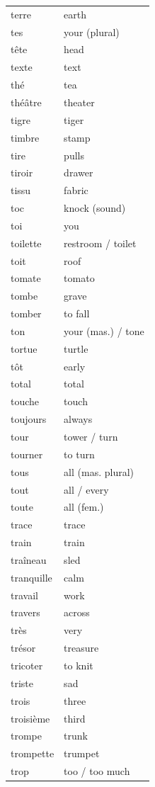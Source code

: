 \documentclass[12pt,a4paper]{article}
\begin{document}
\begin{longtable}{p{4cm} p{6cm}}
terre & earth \\
tes & your (plural) \\
tête & head \\
texte & text \\
thé & tea \\
théâtre & theater \\
tigre & tiger \\
timbre & stamp \\
tire & pulls \\
tiroir & drawer \\
tissu & fabric \\
toc & knock (sound) \\
toi & you \\
toilette & restroom / toilet \\
toit & roof \\
tomate & tomato \\
tombe & grave \\
tomber & to fall \\
ton & your (mas.) / tone \\
tortue & turtle \\
tôt & early \\
total & total \\
touche & touch \\
toujours & always \\
tour & tower / turn \\
tourner & to turn \\
tous & all (mas. plural) \\
tout & all / every \\
toute & all (fem.) \\
trace & trace \\
train & train \\
traîneau & sled \\
tranquille & calm \\
travail & work \\
travers & across \\
très & very \\
trésor & treasure \\
tricoter & to knit \\
triste & sad \\
trois & three \\
troisième & third \\
trompe & trunk \\
trompette & trumpet \\
trop & too / too much \\

\end{longtable}
\end{document}

